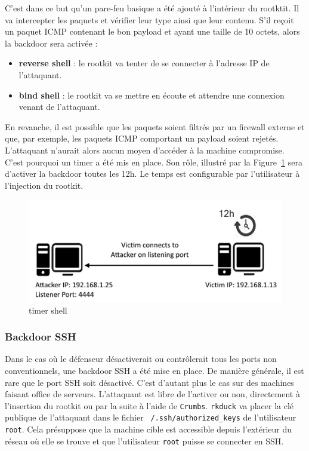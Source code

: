 \documentclass[12pt]{article}
\begin{document}
C'est dans ce but qu'un pare-feu basique a été ajouté à l'intérieur du rootktit. Il va intercepter les paquets et vérifier leur type ainsi que leur contenu. S'il reçoit un paquet ICMP contenant le bon payload et ayant une taille de 10 octets, alors la backdoor sera activée :
\begin{itemize}
 \item \textbf{reverse shell} : le rootkit va tenter de se connecter à l'adresse IP de l'attaquant.
 \item \textbf{bind shell} : le rootkit va se mettre en écoute et attendre une connexion venant de l'attaquant.
\end{itemize}

    En revanche, il est possible que les paquets soient filtrés par un firewall externe et que, par exemple, les paquets ICMP comportant un payload soient rejetés. L'attaquant n'aurait alors aucun moyen d'accéder à la machine compromise. C'est pourquoi un timer a été mis en place. Son rôle, illustré par la Figure~\ref{figure:4} sera d'activer la backdoor toutes les 12h. Le temps est configurable par l'utilisateur à l'injection du rootkit.
        
\begin{figure}[H] 
\begin{center}
\includegraphics{./img/timer-shell.png}

\caption[dsfsdf]{timer shell}
\label{figure:4}
\end{center}
\end{figure}
                    
            
        \subsubsection{Backdoor SSH}
        
        	Dans le cas où le défenseur désactiverait ou contrôlerait tous les ports non conventionnels, une backdoor SSH a été mise en place. De manière générale, il est rare que le port SSH soit désactivé. C'est d'autant plus le cas sur des machines faisant office de serveurs. L'attaquant est libre de l'activer ou non, directement à l'insertion du rootkit ou par la suite à l'aide de \texttt{Crumbs}. \texttt{rkduck} va placer la clé publique de l'attaquant dans le fichier \texttt{~/.ssh/authorized\_keys} de l'utilisateur \texttt{root}. Cela présuppose que la machine cible est accessible depuis l'extérieur du réseau où elle se trouve et que l'utilisateur \texttt{root} puisse se connecter en SSH. \\
            
\end{document}
